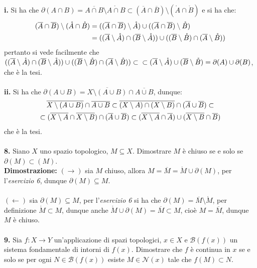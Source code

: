 \documentclass{article}
\begin{document}
\textbf{i.} Si ha che $\partial (A \cap B) = \overline{A \cap B} \setminus \mathring{A \cap B} \subset (\overline{A} \cap \overline{B}) \setminus (\mathring{A} \cap \mathring{B})$ e si ha che:
\begin{align}
    (\overline{A} \cap \overline{B}) \setminus (\mathring{A} \cap \mathring{B}) &= ((\overline{A} \cap \overline{B}) \setminus \mathring{A}) \cup ((\overline{A} \cap \overline{B}) \setminus \mathring{B}) \notag \\
    &= ((\overline{A} \setminus \mathring{A}) \cap (\overline{B} \setminus \mathring{A})) \cup ((\overline{B} \setminus \mathring{B}) \cap (\overline{A} \setminus \mathring{B})) \notag
\end{align}
pertanto si vede facilmente che $((\overline{A} \setminus \mathring{A}) \cap (\overline{B} \setminus \mathring{A})) \cup ((\overline{B} \setminus \mathring{B}) \cap (\overline{A} \setminus \mathring{B})) \subset\\\subset (\overline{A} \setminus \mathring{A}) \cup (\overline{B} \setminus \mathring{B}) = \partial (A) \cup \partial (B)$, che è la tesi. \\ \\
\textbf{ii.} Si ha che $\partial (A \cup B) = \overline{X \setminus (A \cup B)} \cap \overline{A \cup B}$, dunque:
\begin{gather}
    \overline{X \setminus (A \cup B)} \cap \overline{A \cup B} \subset \overline{(X \setminus A) \cap (X \setminus B)} \cap (\overline{A} \cup \overline{B}) \subset \notag \\
    \subset (\overline{X \setminus A} \cap \overline{X \setminus B}) \cap (\overline{A} \cup \overline{B}) \subset (\overline{X \setminus A} \cap \overline{A}) \cup (\overline{X \setminus B} \cap \overline{B}) \notag
\end{gather}
che è la tesi. \\ \\
\textbf{8.} Siano $X$ uno spazio topologico, $M \subseteq X$. Dimostrare $M$ è chiuso se e solo se $\partial(M) \subset (M)$. \\

\textbf{Dimostrazione:} $(\rightarrow)$ sia $M$ chiuso, allora $M = \overline{M} = \mathring{M} \cup \partial(M)$, per l'\textit{esercizio 6}, dunque $\partial(M) \subseteq M$. \\ \\
$(\leftarrow)$ sia $\partial(M) \subseteq M$, per l'\textit{esercizio 6} si ha che $\partial(M) = \overline{M} \setminus \mathring{M}$, per definizione $\mathring{M} \subset M$, dunque anche $\mathring{M} \cup \partial(M) = \overline{M} \subset M$, cioè $M = \overline{M}$, dunque $M$ è chiuso.  \\ \\
\textbf{9.} Sia $f : X \longrightarrow Y$ un'applicazione di spazi topologici, $x \in X$ e $\mathcal{B}(f(x))$ un sistema fondamentale di intorni di $f(x)$. Dimostrare che $f$ è continua in $x$ se e solo se per ogni $N \in \mathcal{B}(f(x))$ esiste $M \in \mathcal{N}(x)$ tale che $f(M) \subset N$. \\
\end{document}
